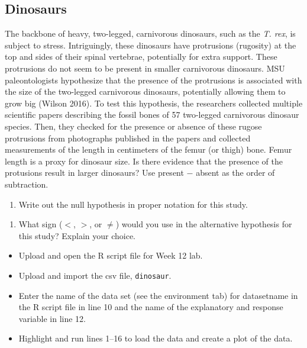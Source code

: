 \documentclass[
]{report}
\providecommand{\tightlist}{%
  \setlength{\itemsep}{0pt}\setlength{\parskip}{0pt}}
\begin{document}
\hypertarget{dinosaurs}{%
\subsection{Dinosaurs}\label{dinosaurs}}

The backbone of heavy, two-legged, carnivorous dinosaurs, such as the \emph{T. rex}, is subject to stress. Intriguingly, these dinosaurs have protrusions (rugosity) at the top and sides of their spinal vertebrae, potentially for extra support. These protrusions do not seem to be present in smaller carnivorous dinosaurs. MSU paleontologists hypothesize that the presence of the protrusions is associated with the size of the two-legged carnivorous dinosaurs, potentially allowing them to grow big (Wilson 2016). To test this hypothesis, the researchers collected multiple scientific papers describing the fossil bones of 57 two-legged carnivorous dinosaur species. Then, they checked for the presence or absence of these rugose protrusions from photographs published in the papers and collected measurements of the length in centimeters of the femur (or thigh) bone. Femur length is a proxy for dinosaur size. Is there evidence that the presence of the protusions result in larger dinosaurs? Use present \(-\) absent as the order of subtraction.

\begin{enumerate}
\def\labelenumi{\arabic{enumi}.}
\setcounter{enumi}{3}
\tightlist
\item
  Write out the null hypothesis in proper notation for this study.
\end{enumerate}

\vspace{0.4in}

\begin{enumerate}
\def\labelenumi{\arabic{enumi}.}
\setcounter{enumi}{4}
\tightlist
\item
  What sign (\(<\), \(>\), or \(\neq\)) would you use in the alternative hypothesis for this study? Explain your choice.
\end{enumerate}

\vspace{0.4in}

\begin{itemize}
\item
  Upload and open the R script file for Week 12 lab.
\item
  Upload and import the csv file, \texttt{dinosaur}.
\item
  Enter the name of the data set (see the environment tab) for datasetname in the R script file in line 10 and the name of the explanatory and response variable in line 12.
\item
  Highlight and run lines 1--16 to load the data and create a plot of the data.
\end{itemize}
\end{document}
